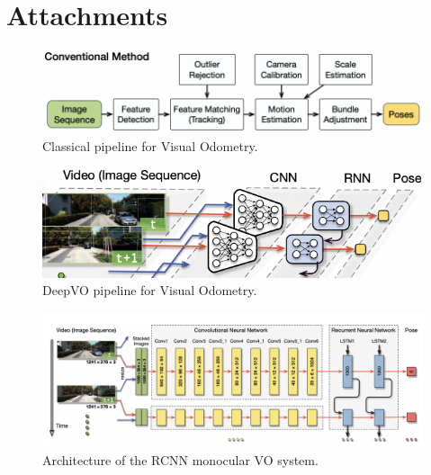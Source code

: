 \section*{Attachments}
    
    
    \begin{figure}[h]
        \centering
        \includegraphics[width=0.75\columnwidth]{figuras/figura1.png}
        \caption{Classical pipeline for Visual Odometry.}
        \label{fig:1}
    \end{figure}

    \begin{figure}[h]
        \centering
        \includegraphics[width=0.75\columnwidth]{figuras/figura2.png}
        \caption{DeepVO pipeline for Visual Odometry.}
        \label{fig:2}
    \end{figure}
    
    \begin{figure}[h]
        \centering
        \includegraphics[width=0.65\columnwidth]{figuras/figura8.png}
        \caption{Architecture of the RCNN monocular VO system.}
        \label{fig:8}
    \end{figure}        
    
